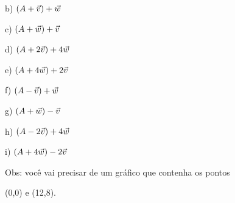 \documentclass[oneside,12pt]{article}
\begin{document}
b) $(A+{\vec v})+{\vec w}$

c) $(A+{\vec w})+{\vec v}$

d) $(A+2{\vec v})+4{\vec w}$

e) $(A+4{\vec w})+2{\vec v}$

f) $(A-{\vec v})+{\vec w}$

g) $(A+{\vec w})-{\vec v}$

h) $(A-2{\vec v})+4{\vec w}$

i) $(A+4{\vec w})-2{\vec v}$

\msk

Obs: você vai precisar de um gráfico que contenha os pontos

(0,0) e (12,8).







\end{document}
